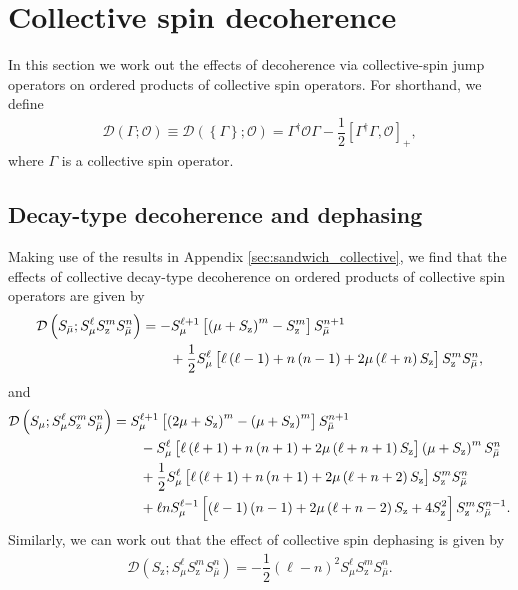 \documentclass[aps,notitlepage,nofootinbib,11pt]{revtex4-1}
\newcommand{\f}[2]{\dfrac{#1}{#2}} %
\newcommand{\p}[1]{\left(#1\right)} %
\renewcommand{\sp}[1]{\left[#1\right]} %
\renewcommand{\set}[1]{\left\{#1\right\}} %
\newcommand{\D}{\mathcal{D}}
\renewcommand{\O}{\mathcal{O}}
\newcommand{\z}{\text{z}}
\newcommand{\bmu}{{\bar\mu}}
\newcommand{\1}{\mathds{1}}
\begin{document}
\section{Collective spin decoherence}
\label{sec:decoherence_collective}

In this section we work out the effects of decoherence via
collective-spin jump operators on ordered products of collective spin
operators.  For shorthand, we define
\begin{align}
  \D\p{\Gamma;\O}
  \equiv \D\p{\set{\Gamma};\O}
  = \Gamma^\dag \O \Gamma - \f12\sp{\Gamma^\dag \Gamma, \O}_+,
\end{align}
where $\Gamma$ is a collective spin operator.

\subsection{Decay-type decoherence and dephasing}
\label{sec:decay_dephasing_collective}

Making use of the results in Appendix \ref{sec:sandwich_collective},
we find that the effects of collective decay-type decoherence on
ordered products of collective spin operators are given by
\begin{align}
  \D\p{S_\bmu; S_\mu^\ell S_\z^m S_\bmu^n}
  &= -S_\mu^{\ell+1} \sp{\p{\mu+S_\z}^m - S_\z^m} S_\bmu^{n+1} \notag \\
  &\qquad + \f12 S_\mu^\ell \sp{\ell\p{\ell-1} + n\p{n-1}
    + 2\mu\p{\ell+n} S_\z} S_\z^m S_\bmu^n,
\end{align}
and
\begin{align}
  \D\p{S_\mu; S_\mu^\ell S_\z^m S_\bmu^n}
  &= S_\mu^{\ell+1} \sp{\p{2\mu + S_\z}^m-\p{\mu + S_\z}^m}
  S_\bmu^{n+1} \notag \\
  &\qquad - S_\mu^\ell
  \sp{\ell\p{\ell+1} + n\p{n+1}+2\mu\p{\ell+n+1} S_\z}
  \p{\mu+S_\z}^m S_\bmu^n \notag \\
  &\qquad + \f12 S_\mu^\ell
  \sp{\ell\p{\ell+1} + n\p{n+1}+2\mu\p{\ell+n+2} S_\z}
  S_\z^m S_\bmu^n \notag \\
  &\qquad + \ell n S_\mu^{\ell-1}
  \sp{\p{\ell-1}\p{n-1}+2\mu\p{\ell+n-2} S_\z + 4 S_\z^2}
  S_\z^m S_\bmu^{n-1}.
\end{align}
Similarly, we can work out that the effect of collective spin
dephasing is given by
\begin{align}
  \D\p{S_\z; S_\mu^\ell S_\z^m S_\bmu^n}
  = -\f12 \p{\ell-n}^2 S_\mu^\ell S_\z^m S_\bmu^n.
\end{align}
\end{document}
